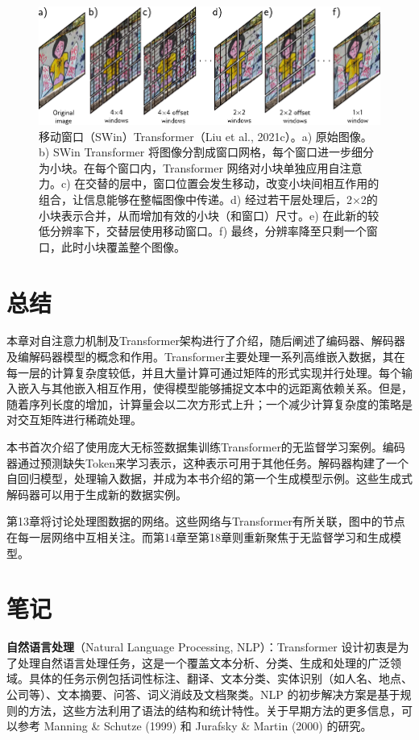 \documentclass[lang=cn,newtx,10pt,scheme=chinese]{elegantbook}
\begin{document}
\begin{figure}[ht!]
\centering
\includegraphics[width=0.7\linewidth]{PDFFigures/UDLChap12PDF/TransformerSWIN_compressed.pdf}
\caption{移动窗口（SWin）Transformer（Liu et al., 2021c）。a) 原始图像。b) SWin Transformer 将图像分割成窗口网格，每个窗口进一步细分为小块。在每个窗口内，Transformer 网络对小块单独应用自注意力。c) 在交替的层中，窗口位置会发生移动，改变小块间相互作用的组合，让信息能够在整幅图像中传递。d) 经过若干层处理后，2×2的小块表示合并，从而增加有效的小块（和窗口）尺寸。e) 在此新的较低分辨率下，交替层使用移动窗口。f) 最终，分辨率降至只剩一个窗口，此时小块覆盖整个图像。}
\end{figure}


\section{总结}
本章对自注意力机制及Transformer架构进行了介绍，随后阐述了编码器、解码器及编解码器模型的概念和作用。Transformer主要处理一系列高维嵌入数据，其在每一层的计算复杂度较低，并且大量计算可通过矩阵的形式实现并行处理。每个输入嵌入与其他嵌入相互作用，使得模型能够捕捉文本中的远距离依赖关系。但是，随着序列长度的增加，计算量会以二次方形式上升；一个减少计算复杂度的策略是对交互矩阵进行稀疏处理。

本书首次介绍了使用庞大无标签数据集训练Transformer的无监督学习案例。编码器通过预测缺失Token来学习表示，这种表示可用于其他任务。解码器构建了一个自回归模型，处理输入数据，并成为本书介绍的第一个生成模型示例。这些生成式解码器可以用于生成新的数据实例。

第13章将讨论处理图数据的网络。这些网络与Transformer有所关联，图中的节点在每一层网络中互相关注。而第14章至第18章则重新聚焦于无监督学习和生成模型。

\section{笔记}
\textbf{自然语言处理}（Natural Language Processing, NLP）：Transformer 设计初衷是为了处理自然语言处理任务，这是一个覆盖文本分析、分类、生成和处理的广泛领域。具体的任务示例包括词性标注、翻译、文本分类、实体识别（如人名、地点、公司等）、文本摘要、问答、词义消歧及文档聚类。NLP 的初步解决方案是基于规则的方法，这些方法利用了语法的结构和统计特性。关于早期方法的更多信息，可以参考 Manning \& Schutze (1999) 和 Jurafsky \& Martin (2000) 的研究。
\end{document}
